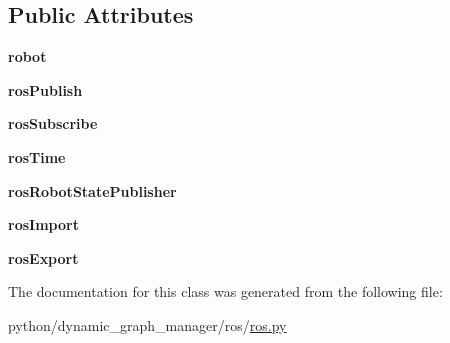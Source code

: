 \subsection*{Public Attributes}
\begin{DoxyCompactItemize}
\item 
{\bfseries robot}\hypertarget{classros_1_1ros_1_1Ros_a0befef81b5386c7b5b1ca0d13d0d2a64}{}\label{classros_1_1ros_1_1Ros_a0befef81b5386c7b5b1ca0d13d0d2a64}

\item 
{\bfseries ros\+Publish}\hypertarget{classros_1_1ros_1_1Ros_a2ddca71f44605c7268029a374070d64b}{}\label{classros_1_1ros_1_1Ros_a2ddca71f44605c7268029a374070d64b}

\item 
{\bfseries ros\+Subscribe}\hypertarget{classros_1_1ros_1_1Ros_a31ff2a70df03c3a0283e4b8a17c019e2}{}\label{classros_1_1ros_1_1Ros_a31ff2a70df03c3a0283e4b8a17c019e2}

\item 
{\bfseries ros\+Time}\hypertarget{classros_1_1ros_1_1Ros_a323ae5f5e4205f31f1bda8424bf534e6}{}\label{classros_1_1ros_1_1Ros_a323ae5f5e4205f31f1bda8424bf534e6}

\item 
{\bfseries ros\+Robot\+State\+Publisher}\hypertarget{classros_1_1ros_1_1Ros_ae35fd5139c151671b1134f4725cbcc33}{}\label{classros_1_1ros_1_1Ros_ae35fd5139c151671b1134f4725cbcc33}

\item 
{\bfseries ros\+Import}\hypertarget{classros_1_1ros_1_1Ros_adaf7ed0ec413adea74e298742c34b36a}{}\label{classros_1_1ros_1_1Ros_adaf7ed0ec413adea74e298742c34b36a}

\item 
{\bfseries ros\+Export}\hypertarget{classros_1_1ros_1_1Ros_a9631d40df4f07890316cead5a94876a3}{}\label{classros_1_1ros_1_1Ros_a9631d40df4f07890316cead5a94876a3}

\end{DoxyCompactItemize}


The documentation for this class was generated from the following file\+:\begin{DoxyCompactItemize}
\item 
python/dynamic\+\_\+graph\+\_\+manager/ros/\hyperlink{ros_8py}{ros.\+py}\end{DoxyCompactItemize}
